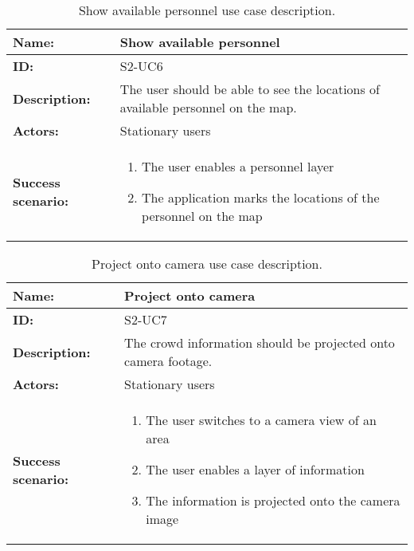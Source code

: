 \begin{table}[htbp]
    \centering
    \begin{tabularx}{\textwidth}{lX}
        \toprule
        \textbf{Name:}  & Show available personnel \\ \midrule
        \textbf{ID:}    & S2-UC6 \\ \midrule
        \textbf{Description:} & The user should be able to see the locations of available personnel on the map. \\ \midrule
        \textbf{Actors:} & Stationary users \\ \midrule
        \textbf{Success scenario:} & 
        \begin{enumerate}
            \item The user enables a personnel layer
            \item The application marks the locations of the personnel on the map
        \end{enumerate}
        \\ \bottomrule
    \end{tabularx}
    \caption{Show available personnel use case description.}
    \label{tab:s2-uc6}
\end{table}


\begin{table}[htbp]
    \centering
    \begin{tabularx}{\textwidth}{lX}
        \toprule
        \textbf{Name:}  & Project onto camera \\ \midrule
        \textbf{ID:}    & S2-UC7 \\ \midrule
        \textbf{Description:} & The crowd information should be projected onto camera footage. \\ \midrule
        \textbf{Actors:} & Stationary users \\ \midrule
        \textbf{Success scenario:} & 
        \begin{enumerate}
            \item The user switches to a camera view of an area
            \item The user enables a layer of information
            \item The information is projected onto the camera image
        \end{enumerate}
        \\ \bottomrule
    \end{tabularx}
    \caption{Project onto camera use case description.}
    \label{tab:s2-uc7}
\end{table}
